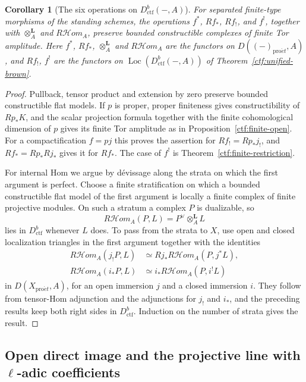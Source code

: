 \documentclass[11pt,a4paper]{article}
\numberwithin{equation}{section}
\newtheorem{corollary}[theorem]{Corollary}
\theoremstyle{definition}
\theoremstyle{remark}
\newcommand{\Loc}{\operatorname{Loc}}
\newcommand{\proet}{\mathrm{pro}\acute{e}t}
\newcommand{\Dctf}{D^b_{\mathrm{ctf}}}
\begin{document}
\begin{corollary}[The six operations on $\Dctf(-,A)$]
\label{ctf:finite-operations}
For separated finite-type morphisms of the standing schemes, the
operations $f^*$, $Rf_*$, $Rf_!$, and $f^!$, together with
$\otimes_A^{\mathbf L}$ and $R\mathcal Hom_A$, preserve bounded
constructible complexes of finite Tor amplitude. Here $f^*$, $Rf_*$,
$\otimes_A^{\mathbf L}$ and $R\mathcal Hom_A$ are the functors on
$D((-)_{\proet},A)$, and $Rf_!$, $f^!$ are the functors on
$\Loc(\Dctf(-,A))$ of Theorem~\ref{ctf:unified-brown}.
\end{corollary}

\begin{proof}
Pullback, tensor product and extension by zero preserve bounded
constructible flat models. If $p$ is proper, proper finiteness gives
constructibility of $Rp_*K$, and the scalar projection formula together
with the finite cohomological dimension of $p$ gives its finite Tor
amplitude as in Proposition~\ref{ctf:finite-open}. For a
compactification $f=pj$ this proves the assertion for $Rf_!=Rp_*j_!$,
and $Rf_*=Rp_*Rj_*$ gives it for $Rf_*$. The case of $f^!$ is
Theorem~\ref{ctf:finite-restriction}.

For internal Hom we argue by d\'evissage along the strata on which the
first argument is perfect. Choose a finite stratification on which a
bounded constructible flat model of the first argument is locally a
finite complex of finite projective modules. On such a stratum a
complex $P$ is dualizable, so
\[
 R\mathcal Hom_A(P,L)=P^\vee\otimes_A^{\mathbf L}L
\]
lies in $\Dctf$ whenever $L$ does. To pass from the strata to $X$, use open
and closed localization triangles in the first argument together with
the identities
\[
\begin{aligned}
 R\mathcal Hom_A(j_!P,L)
   &\simeq Rj_*R\mathcal Hom_A(P,j^*L),\\
 R\mathcal Hom_A(i_*P,L)
   &\simeq i_*R\mathcal Hom_A(P,i^!L)
\end{aligned}
\]
in $D(X_{\proet},A)$, for an open immersion $j$ and a closed immersion $i$. They follow from
tensor-Hom adjunction and the adjunctions for $j_!$ and $i_*$, and the
preceding results keep both right sides in $\Dctf$. Induction on the
number of strata gives the result.
\end{proof}


\subsection{Open direct image and the projective line with \texorpdfstring{$\ell$}{l}-adic coefficients}
\label{b:sec:late-coefficients}
\end{document}
